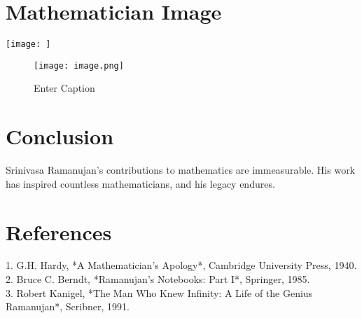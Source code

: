 \documentclass[a4paper,10pt]{article}
\begin{document}
\section*{Mathematician Image}
\begin{center}
\texttt{[image: ]} 
\begin{figure}
    \centering
    \texttt{[image: image.png]}
    \caption{Enter Caption}
    \label{fig:enter-label}
\end{figure}

\end{center}

\section{Conclusion}
Srinivasa Ramanujan's contributions to mathematics are immeasurable. His work has inspired countless mathematicians, and his legacy endures.

\section*{References}
1. G.H. Hardy, *A Mathematician's Apology*, Cambridge University Press, 1940. \\
2. Bruce C. Berndt, *Ramanujan's Notebooks: Part I*, Springer, 1985. \\
3. Robert Kanigel, *The Man Who Knew Infinity: A Life of the Genius Ramanujan*, Scribner, 1991.
\end{document}
